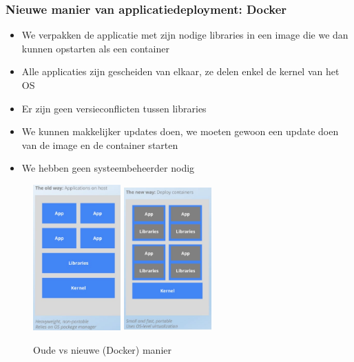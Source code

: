 \documentclass{article}
\begin{document}
\subsubsection{Nieuwe manier van applicatiedeployment: Docker}

\begin{itemize}
    \item We verpakken de applicatie met zijn nodige libraries in een image die we dan kunnen opstarten als een container
    \item Alle applicaties zijn gescheiden van elkaar, ze delen enkel de kernel van het OS
    \item Er zijn geen versieconflicten tussen libraries
    \item We kunnen makkelijker updates doen, we moeten gewoon een update doen van de image en de container starten
    \item We hebben geen systeembeheerder nodig
\end{itemize}

\begin{figure}[H]
    \centering
    \includegraphics[width=0.3\textwidth]{docker-old-deployment.png}
    \includegraphics[width=0.3\textwidth]{docker-new-deployment.png}
    \caption{Oude vs nieuwe (Docker) manier}
\end{figure}
\end{document}
